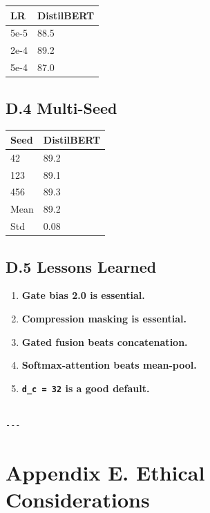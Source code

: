 \begin{table}[H]
\centering
\small
\begin{tabular}{ll}
\toprule
\textbf{LR} & \textbf{DistilBERT} \\
\midrule
5e-5 & 88.5 \\
2e-4 & 89.2 \\
5e-4 & 87.0 \\
\bottomrule
\end{tabular}
\end{table}

\subsection{D.4 Multi-Seed}

\begin{table}[H]
\centering
\small
\begin{tabular}{ll}
\toprule
\textbf{Seed} & \textbf{DistilBERT} \\
\midrule
42 & 89.2 \\
123 & 89.1 \\
456 & 89.3 \\
Mean & 89.2 \\
Std & 0.08 \\
\bottomrule
\end{tabular}
\end{table}

\subsection{D.5 Lessons Learned}

\begin{enumerate}
\item \textbf{Gate bias 2.0 is essential.}
\item \textbf{Compression masking is essential.}
\item \textbf{Gated fusion beats concatenation.}
\item \textbf{Softmax-attention beats mean-pool.}
\item \textbf{\texttt{d\_c = 32} is a good default.}
\end{enumerate}
\begin{lstlisting}

---
\end{lstlisting}


\section{Appendix E. Ethical Considerations}

